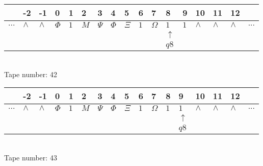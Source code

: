 \documentclass{article}
\begin{document}
\begin{table}[H]
\centering
\begin{tabular}{lllllllllllllllll}
 & -2 & -1 & 0 & 1 & 2 & 3 & 4 & 5 & 6 & 7 & 8 & 9 & 10 & 11 & 12 & \\
\hline
$...$ & \multicolumn{1}{|l|}{$\wedge$} & \multicolumn{1}{|l|}{$\wedge$} & \multicolumn{1}{|l|}{$\Phi$} & \multicolumn{1}{|l|}{$1$} & \multicolumn{1}{|l|}{$M$} & \multicolumn{1}{|l|}{$\Psi$} & \multicolumn{1}{|l|}{$\Phi$} & \multicolumn{1}{|l|}{$\Xi$} & \multicolumn{1}{|l|}{$1$} & \multicolumn{1}{|l|}{$\Omega$} & \multicolumn{1}{|l|}{$1$} & \multicolumn{1}{|l|}{$1$} & \multicolumn{1}{|l|}{$\wedge$} & \multicolumn{1}{|l|}{$\wedge$} & \multicolumn{1}{|l|}{$\wedge$} & $...$\\
\hline
&  &  &  &  &  &  &  &  &  &  & $\uparrow$ &  &  &  &  &  \\
&  &  &  &  &  &  &  &  &  &  & $ q8 $ &  &  &  &  &  \\
\end{tabular}
\\
Tape number: 42
\noindent\makebox[\linewidth]{\hdashrule{\textwidth}{1pt}{1pt}}\end{table}

\begin{table}[H]
\centering
\begin{tabular}{lllllllllllllllll}
 & -2 & -1 & 0 & 1 & 2 & 3 & 4 & 5 & 6 & 7 & 8 & 9 & 10 & 11 & 12 & \\
\hline
$...$ & \multicolumn{1}{|l|}{$\wedge$} & \multicolumn{1}{|l|}{$\wedge$} & \multicolumn{1}{|l|}{$\Phi$} & \multicolumn{1}{|l|}{$1$} & \multicolumn{1}{|l|}{$M$} & \multicolumn{1}{|l|}{$\Psi$} & \multicolumn{1}{|l|}{$\Phi$} & \multicolumn{1}{|l|}{$\Xi$} & \multicolumn{1}{|l|}{$1$} & \multicolumn{1}{|l|}{$\Omega$} & \multicolumn{1}{|l|}{$1$} & \multicolumn{1}{|l|}{$1$} & \multicolumn{1}{|l|}{$\wedge$} & \multicolumn{1}{|l|}{$\wedge$} & \multicolumn{1}{|l|}{$\wedge$} & $...$\\
\hline
&  &  &  &  &  &  &  &  &  &  &  & $\uparrow$ &  &  &  &  \\
&  &  &  &  &  &  &  &  &  &  &  & $ q8 $ &  &  &  &  \\
\end{tabular}
\\
Tape number: 43
\noindent\makebox[\linewidth]{\hdashrule{\textwidth}{1pt}{1pt}}\end{table}
\end{document}
